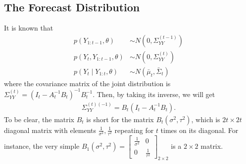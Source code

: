 \subsection{The Forecast Distribution}

It is known that 
\begin{align*}
p(Y_{1:t-1},\theta) &\sim N\left( 0,\Sigma_{YY}^{(t-1)} \right)\\
p(Y_{t},Y_{1:t-1},\theta) &\sim N\left( 0,\Sigma_{YY}^{(t)} \right)\\
p(Y_{t}\mid Y_{1:t},\theta) &\sim N\left( \bar{\mu}_{t},\bar{\Sigma}_{t} \right)
\end{align*}
where the covariance matrix of the joint distribution is $\Sigma_{YY}^{(t)} = (I_{t}-A_{t}^{-1}B_{t})^{-1}B_{t}^{-1}$. Then, by taking its inverse, we will get
\begin{align*}
\Sigma_{YY}^{(t) (-1)} = B_{t}(I_{t}-A_{t}^{-1}B_{t}).
\end{align*}
To be clear, the matrix $B_{t}$ is short for the matrix $B_{t}(\sigma^2,\tau^2)$, which is $2t\times 2t$ diagonal matrix with elements $\frac{1}{\sigma^2},\frac{1}{\tau^2}$ repeating for $t$ times on its diagonal. For instance, the very simple $B_1(\sigma^2,\tau^2) = 
\begin{bmatrix}
\frac{1}{\sigma^2} & 0  \\
0 & \frac{1}{\tau^2}
\end{bmatrix}_{2\times 2}$ is a $2\times 2$ matrix. 

